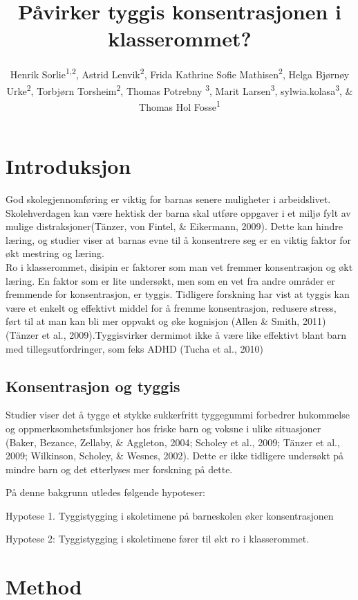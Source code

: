 \documentclass[english,man]{apa6}
\author{Henrik Sorlie\textsuperscript{1,2}, Astrid Lenvik\textsuperscript{2}, Frida Kathrine Sofie Mathisen\textsuperscript{2}, Helga Bjørnøy Urke\textsuperscript{2}, Torbjørn Torsheim\textsuperscript{2}, Thomas Potrebny \textsuperscript{3}, Marit Larsen\textsuperscript{3}, sylwia.kolasa\textsuperscript{3}, \& Thomas Hol Fosse\textsuperscript{1}}
\affiliation{
\vspace{0.5cm}
\textsuperscript{1} Forsvarets hogskole\\\textsuperscript{2} Universitetet i Bergen\\\textsuperscript{3} Hoegskulen på Vestlandet\\\textsuperscript{4} Norce}
\title{Påvirker tyggis konsentrasjonen i klasserommet?}
\date{}
\begin{document}
\maketitle

\hypertarget{introduksjon}{%
\section{Introduksjon}\label{introduksjon}}

God skolegjennomføring er viktig for barnas senere muligheter i arbeidslivet.
Skolehverdagen kan være hektisk der barna skal utføre oppgaver i et miljø fylt av mulige distraksjoner(Tänzer, von Fintel, \& Eikermann, 2009).
Dette kan hindre læring, og studier viser at barnas evne til å konsentrere seg er en viktig faktor for økt mestring og læring.\\
Ro i klasserommet, disipin er faktorer som man vet fremmer konsentrasjon og økt læring.
En faktor som er lite undersøkt, men som en vet fra andre områder er fremmende for konsentrasjon, er tyggis.
Tidligere forskning har vist at tyggis kan være et enkelt og effektivt middel for å fremme konsentrasjon, redusere stress, ført til at man kan bli mer oppvakt og øke kognisjon (Allen \& Smith, 2011)(Tänzer et al., 2009).Tyggisvirker dermimot ikke å være like effektivt blant barn med tillegsutfordringer, som feks ADHD (Tucha et al., 2010)

\hypertarget{konsentrasjon-og-tyggis}{%
\subsection{Konsentrasjon og tyggis}\label{konsentrasjon-og-tyggis}}

Studier viser det å tygge et stykke sukkerfritt tyggegummi forbedrer hukommelse og oppmerksomhetsfunksjoner hos friske barn og voksne i ulike situasjoner (Baker, Bezance, Zellaby, \& Aggleton, 2004; Scholey et al., 2009; Tänzer et al., 2009; Wilkinson, Scholey, \& Wesnes, 2002).
Dette er ikke tidligere undersøkt på mindre barn og det etterlyses mer forskning på dette.

På denne bakgrunn utledes følgende hypoteser:

Hypotese 1. Tyggistygging i skoletimene på barneskolen øker konsentrasjonen

Hypotese 2: Tyggistygging i skoletimene fører til økt ro i klasserommet.

\hypertarget{method}{%
\section{Method}\label{method}}
\end{document}
